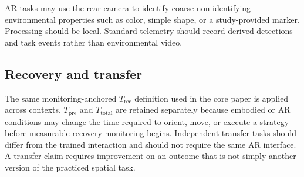 AR tasks may use the rear camera to identify coarse non-identifying environmental properties such as color, simple shape, or a study-provided marker. Processing should be local. Standard telemetry should record derived detections and task events rather than environmental video.

\subsection{Recovery and transfer}

The same monitoring-anchored \(T_{\mathrm{rec}}\) definition used in the core paper is applied across contexts. \(T_{\mathrm{pre}}\) and \(T_{\mathrm{total}}\) are retained separately because embodied or AR conditions may change the time required to orient, move, or execute a strategy before measurable recovery monitoring begins. Independent transfer tasks should differ from the trained interaction and should not require the same AR interface. A transfer claim requires improvement on an outcome that is not simply another version of the practiced spatial task.
